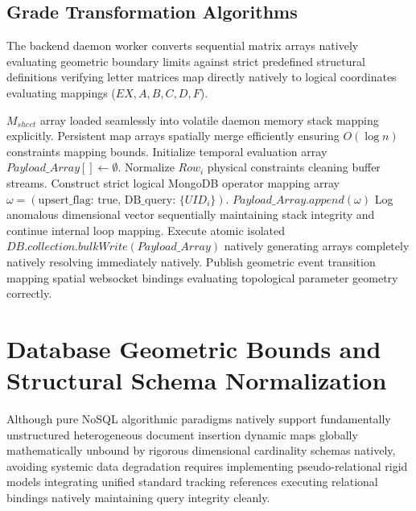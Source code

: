 \documentclass[journal,onecolumn,10pt,draftclsnofoot]{IEEEtran}
\begin{document}
\subsection{Grade Transformation Algorithms}
The backend daemon worker converts sequential matrix arrays natively evaluating geometric boundary limits against strict predefined structural definitions verifying letter matrices map directly natively to logical coordinates evaluating mappings ($EX, A, B, C, D, F$).
\begin{algorithm}[H]
\caption{Offline Bulk Upsert Data Aggregation Matrix Evaluation}
\begin{algorithmic}[1]
\REQUIRE $M_{sheet}$ array loaded seamlessly into volatile daemon memory stack mapping explicitly.
\ENSURE Persistent map arrays spatially merge efficiently ensuring $O(\log n)$ constraints mapping bounds.
\STATE Initialize temporal evaluation array $Payload\_Array[] \gets \emptyset$.
        \STATE Normalize $Row_i$ physical constraints cleaning buffer streams.
        \STATE Construct strict logical MongoDB operator mapping array $\omega = (\text{upsert\_flag: true, DB\_query: } \{UID_i\})$.
        \STATE $Payload\_Array.append(\omega)$
    \ELSE
        \STATE Log anomalous dimensional vector sequentially maintaining stack integrity and continue internal loop mapping.
    \ENDIF
\ENDFOR
\STATE Execute atomic isolated $DB.collection.bulkWrite(Payload\_Array)$ natively generating arrays completely natively resolving immediately natively.
\STATE Publish geometric event transition mapping spatial websocket bindings evaluating topological parameter geometry correctly.
\end{algorithmic}
\end{algorithm}

\newpage

\section{Database Geometric Bounds and Structural Schema Normalization}

Although pure NoSQL algorithmic paradigms natively support fundamentally unstructured heterogeneous document insertion dynamic maps globally mathematically unbound by rigorous dimensional cardinality schemas natively, avoiding systemic data degradation requires implementing pseudo-relational rigid models integrating unified standard tracking references executing relational bindings natively maintaining query integrity cleanly.
\end{document}
